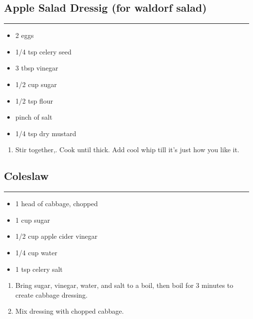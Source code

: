 \documentclass{article}
\begin{document}
\subsection{Apple Salad Dressig (for waldorf salad)} 
\noindent\rule[0.5ex]{\linewidth}{1pt}

\begin{framed}
\begin{itemize}
    \item 2 eggs
    \item 1/4 tsp celery seed
    \item 3 tbsp vinegar
    \item 1/2 cup sugar
    \item 1/2 tsp flour
    \item pinch of salt
    \item 1/4 tsp dry mustard
\end{itemize}
\end{framed}

\begin{enumerate}
    \item
        Stir together,. Cook until thick. Add cool whip till it’s just how you like it.
\end{enumerate}
\newpage

\subsection{Coleslaw} 
\noindent\rule[0.5ex]{\linewidth}{1pt}

\begin{framed}
    \begin{itemize}
        \item 1 head of cabbage, chopped
        \item 1 cup sugar
        \item 1/2 cup apple cider vinegar
        \item 1/4 cup water
        \item 1 tsp celery salt
    \end{itemize}
\end{framed}

\begin{enumerate}
    \item 
        Bring sugar, vinegar, water, and salt to a boil, then boil for 3 minutes to create cabbage dressing.
    \item 
        Mix dressing with chopped cabbage.
\end{enumerate}
\newpage
\end{document}
